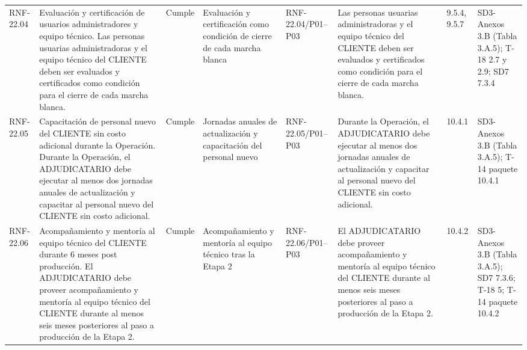 \documentclass[oficio,firma,final]{lafrox}
\begin{document}
\begin{landscape}
{\begin{longtable}{@{}F{0.054} F{0.173} F{0.061} F{0.191} F{0.106} F{0.180} F{0.067} F{0.168}@{}}
  RNF-22.04 & Evaluación y certificación de usuarios administradores y equipo técnico. Las personas usuarias administradoras y el equipo técnico del CLIENTE deben ser evaluados y certificados como condición para el cierre de cada marcha blanca. & Cumple & Evaluación y certificación como condición de cierre de cada marcha blanca & RNF-22.04/\allowbreak{}P01--\allowbreak{}P03 & Las personas usuarias administradoras y el equipo técnico del CLIENTE deben ser evaluados y certificados como condición para el cierre de cada marcha blanca. & 9.5.4, 9.5.7 & SD3-Anexos 3.B (Tabla 3.A.5); T-18 2.7 y 2.9; SD7 7.3.4  \\
  RNF-22.05 & Capacitación de personal nuevo del CLIENTE sin costo adicional durante la Operación. Durante la Operación, el ADJUDICATARIO debe ejecutar al menos dos jornadas anuales de actualización y capacitar al personal nuevo del CLIENTE sin costo adicional. & Cumple & Jornadas anuales de actualización y capacitación del personal nuevo & RNF-22.05/\allowbreak{}P01--\allowbreak{}P03 & Durante la Operación, el ADJUDICATARIO debe ejecutar al menos dos jornadas anuales de actualización y capacitar al personal nuevo del CLIENTE sin costo adicional. & 10.4.1 & SD3-Anexos 3.B (Tabla 3.A.5); T-14 paquete 10.4.1  \\
  RNF-22.06 & Acompañamiento y mentoría al equipo técnico del CLIENTE durante 6 meses post producción. El ADJUDICATARIO debe proveer acompañamiento y mentoría al equipo técnico del CLIENTE durante al menos seis meses posteriores al paso a producción de la Etapa 2. & Cumple & Acompañamiento y mentoría al equipo técnico tras la Etapa 2 & RNF-22.06/\allowbreak{}P01--\allowbreak{}P03 & El ADJUDICATARIO debe proveer acompañamiento y mentoría al equipo técnico del CLIENTE durante al menos seis meses posteriores al paso a producción de la Etapa 2. & 10.4.2 & SD3-Anexos 3.B (Tabla 3.A.5); SD7 7.3.6; T-18 5; T-14 paquete 10.4.2  \\

\end{longtable}}
\end{landscape}
\end{document}
